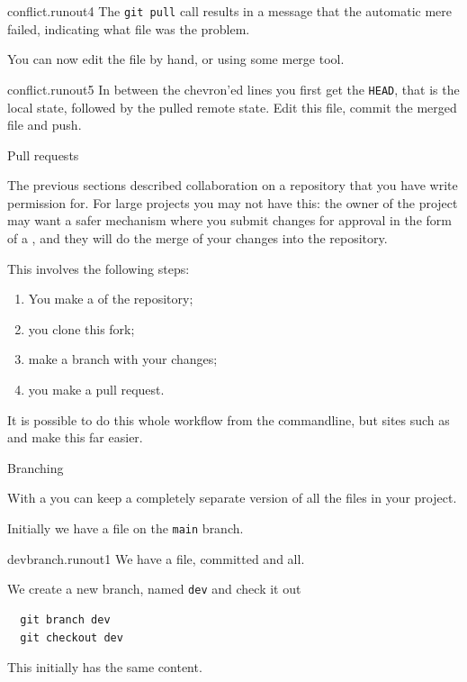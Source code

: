 \begin{gitstep}{conflict.runout4}
  The \lstinline{git pull} call results in a message that the automatic mere failed,
  indicating what file was the problem.
\end{gitstep}

You can now edit the file by hand, or using some merge tool.

\begin{gitstep}{conflict.runout5}
  In between the chevron'ed lines you first get the \lstinline{HEAD},
  that is the local state, followed by the pulled remote state.
  Edit this file, commit the merged file and push.
\end{gitstep}

 {Pull requests}

The previous sections described collaboration on a repository
that you have write permission for.
For large projects you may not have this:
the owner of the project may want a safer mechanism
where you submit changes for approval
in the form of a , and
they will do the merge of your changes into the repository.

This involves the following steps:
\begin{enumerate}
\item You make a  of the repository;
\item you clone this fork;
\item make a branch with your changes;
\item you make a pull request.
\end{enumerate}

It is possible to do this whole workflow from the commandline,
but sites such as  and 
make this far easier.

\newpage
{} {Branching}

With a  you can keep a completely
separate version of all the files in your project.

Initially we have a file on the \lstinline{main} branch.

\begin{gitstep}{devbranch.runout1}
  We have a file, committed and all.
\end{gitstep}

We create a new branch, named \lstinline{dev}
and check it out
\begin{lstlisting}
  git branch dev
  git checkout dev
\end{lstlisting}
This initially has the same content.

